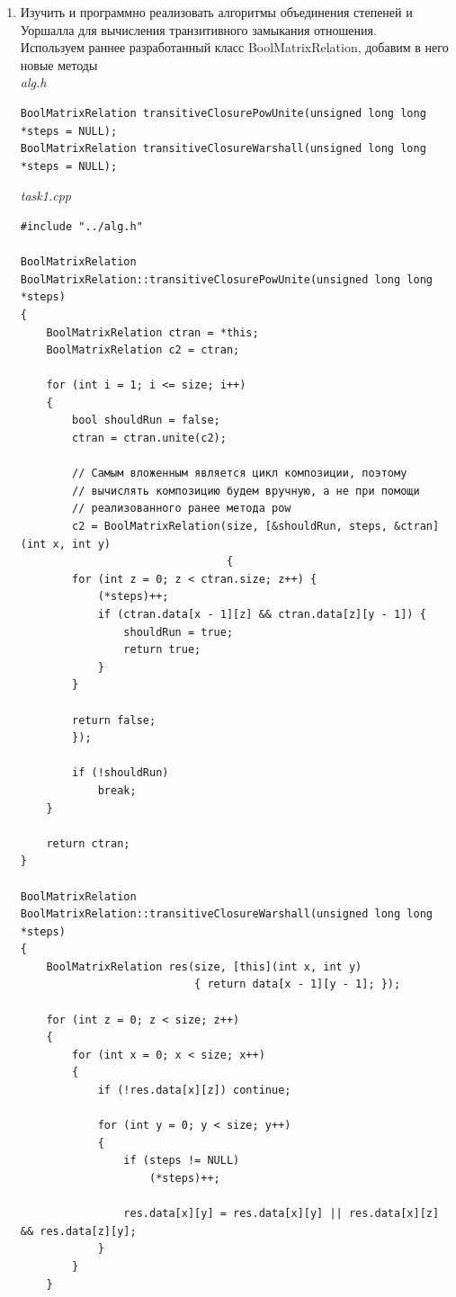\documentclass[a4paper,14pt]{extarticle}
\begin{document}
\begin{enumerate}[1.]
	\item Изучить и программно реализовать алгоритмы объединения степеней
	      и Уоршалла для вычисления транзитивного замыкания отношения.\\
	      Используем раннее разработанный класс BoolMatrixRelation, добавим в него новые методы\\
	      \textit{alg.h}
	      \begin{verbatim}
BoolMatrixRelation transitiveClosurePowUnite(unsigned long long *steps = NULL);
BoolMatrixRelation transitiveClosureWarshall(unsigned long long *steps = NULL);
	\end{verbatim}
	      \textit{task1.cpp}
	      \begin{verbatim}
#include "../alg.h"

BoolMatrixRelation BoolMatrixRelation::transitiveClosurePowUnite(unsigned long long *steps)
{
    BoolMatrixRelation ctran = *this;
    BoolMatrixRelation c2 = ctran;

    for (int i = 1; i <= size; i++)
    {
        bool shouldRun = false;
        ctran = ctran.unite(c2);
        
        // Самым вложенным является цикл композиции, поэтому
        // вычислять композицию будем вручную, а не при помощи 
        // реализованного ранее метода pow
        c2 = BoolMatrixRelation(size, [&shouldRun, steps, &ctran](int x, int y)
                                {
        for (int z = 0; z < ctran.size; z++) {
            (*steps)++;
            if (ctran.data[x - 1][z] && ctran.data[z][y - 1]) {
                shouldRun = true;
                return true;
            }
        }

        return false; 
        });

        if (!shouldRun)
            break;
    }

    return ctran;
}

BoolMatrixRelation BoolMatrixRelation::transitiveClosureWarshall(unsigned long long *steps)
{
    BoolMatrixRelation res(size, [this](int x, int y)
                           { return data[x - 1][y - 1]; });

    for (int z = 0; z < size; z++)
    {
        for (int x = 0; x < size; x++)
        {
            if (!res.data[x][z]) continue;

            for (int y = 0; y < size; y++)
            {
                if (steps != NULL)
                    (*steps)++;

                res.data[x][y] = res.data[x][y] || res.data[x][z] && res.data[z][y];
            }
        }
    }


\end{verbatim}
\end{enumerate}
\end{document}
